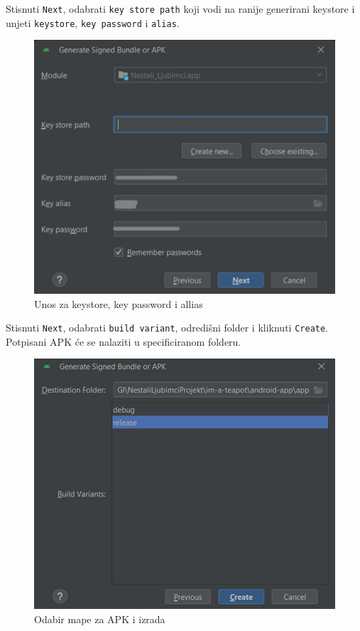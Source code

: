 		Stisnuti \texttt{Next}, odabrati \texttt{key store path} koji vodi na ranije generirani keystore i unjeti \texttt{keystore}, \texttt{key password} i \texttt{alias}.
		
		\begin{figure}[H]
			\includegraphics[scale=0.3]{slike/deploy5.jpg} %
			\centering
			\caption{Unos za keystore, key password i allias}
			\label{fig:deploy5}
		\end{figure}
		
		Stisnuti \texttt{Next}, odabrati \texttt{build variant}, odredišni folder i kliknuti \texttt{Create}. Potpisani APK će se nalaziti u specificiranom folderu.
		
		\begin{figure}[H]
			\includegraphics[scale=0.43]{slike/deploy6.jpg} %
			\centering
			\caption{Odabir mape za APK i izrada}
			\label{fig:deploy6}
		\end{figure}
		
